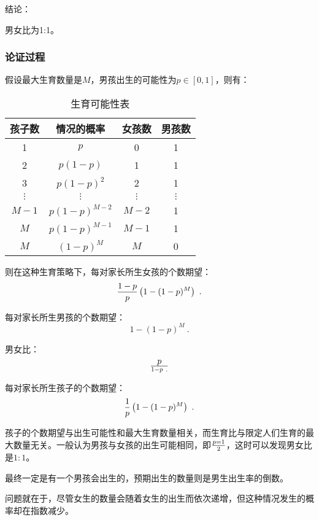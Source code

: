 结论：

男女比为1:1。

\subsubsection{论证过程}


假设最大生育数量是$M$，男孩出生的可能性为$p\in[0,1]$，则有：

\begin{table}[ht]
\centering
\caption{生育可能性表}\label{tab_CitPrb1}
\begin{tabular}{|c|c|c|c|}
\hline
孩子数 & 情况的概率 & 女孩数 & 男孩数 \\
\hline
1 & $p$ & 0 & 1 \\
\hline
2 & $p(1-p)$ & 1 & 1 \\
\hline
3 & $p(1-p)^2$ & 2 & 1 \\
\hline
$\vdots$ & $\vdots$ & $\vdots$ & $\vdots$ \\
\hline
$M-1$ & $p(1-p)^{M-2}$ & $M-2$ & 1 \\
\hline
$M$ & $p(1-p)^{M-1}$ & $M-1$ & 1 \\
\hline
$M$ & $(1-p)^M$ & $M$ & 0 \\
\hline
\end{tabular}
\end{table}
则在这种生育策略下，每对家长所生女孩的个数期望：
\begin{equation}
{1-p\over p}\left(1-(1-p)^M\right)~.
\end{equation}

每对家长所生男孩的个数期望：
\begin{equation}
1-(1-p)^M~.
\end{equation}

男女比：
\begin{equation}
p\over 1-p~.
\end{equation}

每对家长所生孩子的个数期望：
\begin{equation}
{1\over p}\left(1-(1-p)^M\right)~.
\end{equation}

孩子的个数期望与出生可能性和最大生育数量相关，而生育比与限定人们生育的最大数量无关。一般认为男孩与女孩的出生可能相同，即$p=1\over2$，这时可以发现男女比是$1:1$。

最终一定是有一个男孩会出生的，预期出生的数量则是男生出生率的倒数。

问题就在于，尽管女生的数量会随着女生的出生而依次递增，但这种情况发生的概率却在指数减少。

